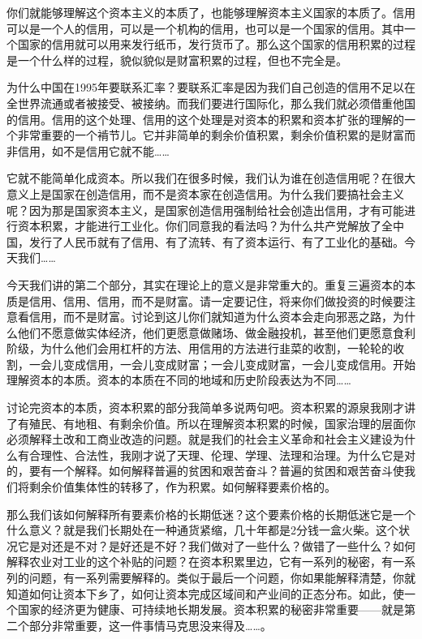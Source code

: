 \documentclass[UTF8, 12pt, a4paper]{ctexrep}
\begin{document}
你们就能够理解这个资本主义的本质了，也能够理解资本主义国家的本质了。信用可以是一个人的信用，可以是一个机构的信用，也可以是一个国家的信用。其中一个国家的信用就可以用来发行纸币，发行货币了。那么这个国家的信用积累的过程是一个什么样的过程，貌似貌似是财富积累的过程，但也不完全是。

为什么中国在1995年要联系汇率？要联系汇率是因为我们自己创造的信用不足以在全世界流通或者被接受、被接纳。而我们要进行国际化，那么我们就必须借重他国的信用。信用的这个处理、信用的这个处理是对资本的积累和资本扩张的理解的一个非常重要的一个褃节儿。它并非简单的剩余价值积累，剩余价值积累的是财富而非信用，如不是信用它就不能……

它就不能简单化成资本。所以我们在很多时候，我们认为谁在创造信用呢？在很大意义上是国家在创造信用，而不是资本家在创造信用。为什么我们要搞社会主义呢？因为那是国家资本主义，是国家创造信用强制给社会创造出信用，才有可能进行资本积累，才能进行工业化。你们同意我的看法吗？为什么共产党解放了全中国，发行了人民币就有了信用、有了流转、有了资本运行、有了工业化的基础。今天我们……

今天我们讲的第二个部分，其实在理论上的意义是非常重大的。重复三遍资本的本质是信用、信用、信用，而不是财富。请一定要记住，将来你们做投资的时候要注意看信用，而不是财富。讨论到这儿你们就知道为什么资本会走向邪恶之路，为什么他们不愿意做实体经济，他们更愿意做赌场、做金融投机，甚至他们更愿意食利阶级，为什么他们会用杠杆的方法、用信用的方法进行韭菜的收割，一轮轮的收割，一会儿变成信用，一会儿变成财富；一会儿变成财富，一会儿变成信用。开始理解资本的本质。资本的本质在不同的地域和历史阶段表达为不同……

讨论完资本的本质，资本积累的部分我简单多说两句吧。资本积累的源泉我刚才讲了有殖民、有地租、有剩余价值。所以在理解资本积累的时候，国家治理的层面你必须解释土改和工商业改造的问题。就是我们的社会主义革命和社会主义建设为什么有合理性、合法性，我刚才说了天理、伦理、学理、法理和治理。为什么它是对的，要有一个解释。如何解释普遍的贫困和艰苦奋斗？普遍的贫困和艰苦奋斗使我们将剩余价值集体性的转移了，作为积累。如何解释要素价格的。

那么我们该如何解释所有要素价格的长期低迷？这个要素价格的长期低迷它是一个什么意义？就是我们长期处在一种通货紧缩，几十年都是2分钱一盒火柴。这个状况它是对还是不对？是好还是不好？我们做对了一些什么？做错了一些什么？如何解释农业对工业的这个补贴的问题？在资本积累里边，它有一系列的秘密，有一系列的问题，有一系列需要解释的。类似于最后一个问题，你如果能解释清楚，你就知道如何让资本下乡了，如何让资本完成区域间和产业间的正态分布。如此，使一个国家的经济更为健康、可持续地长期发展。资本积累的秘密非常重要——就是第二个部分非常重要，这一件事情马克思没来得及……。
\end{document}
